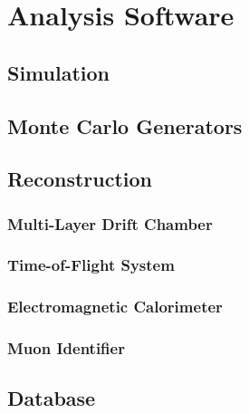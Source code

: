\chapter{Analysis Software}
\label{ch_software}

\section{Simulation}

\section{Monte Carlo Generators}

\section{Reconstruction}

\subsection{Multi-Layer Drift Chamber}

\subsection{Time-of-Flight System}

\subsection{Electromagnetic Calorimeter}

\subsection{Muon Identifier}

\section{Database}
